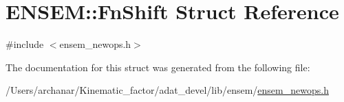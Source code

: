 \hypertarget{structENSEM_1_1FnShift}{}\section{E\+N\+S\+EM\+:\+:Fn\+Shift Struct Reference}
\label{structENSEM_1_1FnShift}


{\ttfamily \#include $<$ensem\+\_\+newops.\+h$>$}



The documentation for this struct was generated from the following file\+:\begin{DoxyCompactItemize}
\item 
/\+Users/archanar/\+Kinematic\+\_\+factor/adat\+\_\+devel/lib/ensem/\mbox{\hyperlink{lib_2ensem_2ensem__newops_8h}{ensem\+\_\+newops.\+h}}\end{DoxyCompactItemize}

